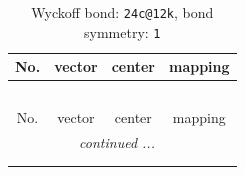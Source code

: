 \documentclass[fleqn,8pt]{jsarticle}
\begin{document}
\renewcommand{\arraystretch}{1.2}
\begin{longtable}{cccc}
\caption{Wyckoff bond: {\tt 24c@12k}, bond symmetry: {\tt 1}}
 \\
 \hline \hline
No. & vector & center & mapping \\ \hline \endfirsthead

\multicolumn{3}{l}{\tablename\ \thetable{}} \\
 \hline \hline
No. & vector & center & mapping \\ \hline \endhead

 \hline \hline
\multicolumn{3}{r}{\footnotesize\it continued ...} \\ \endfoot

 \hline \hline
\multicolumn{3}{r}{} \\ \endlastfoot


\end{longtable}
\end{document}
